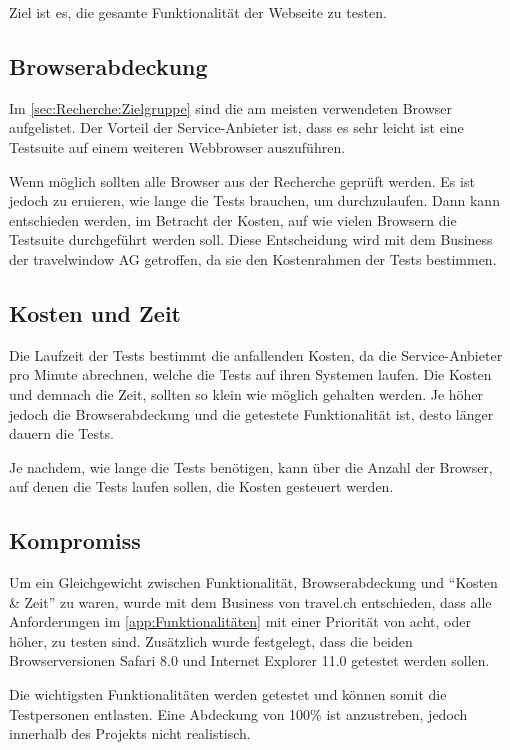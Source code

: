 Ziel ist es, die gesamte Funktionalität der Webseite zu testen.

\subsection{Browserabdeckung}
Im \cref{sec:Recherche:Zielgruppe}  sind die am meisten verwendeten Browser aufgelistet. Der Vorteil der Service-Anbieter ist, dass es sehr leicht ist eine Testsuite auf einem weiteren Webbrowser auszuführen. 

Wenn möglich sollten alle Browser aus der Recherche geprüft werden. Es ist jedoch zu eruieren, wie lange die Tests brauchen, um durchzulaufen. Dann kann entschieden werden, im Betracht der Kosten, auf wie vielen Browsern die Testsuite durchgeführt werden soll. Diese Entscheidung wird mit dem Business der travelwindow AG getroffen, da sie den Kostenrahmen der Tests bestimmen.

\subsection{Kosten und Zeit}
Die Laufzeit der Tests bestimmt die anfallenden Kosten, da die Service-Anbieter pro Minute abrechnen, welche die Tests auf ihren Systemen laufen. Die Kosten und demnach die Zeit, sollten so klein wie möglich gehalten werden. Je höher jedoch die Browserabdeckung und die getestete Funktionalität ist, desto länger dauern die Tests.

Je nachdem, wie lange die Tests benötigen, kann über die Anzahl der Browser, auf denen die Tests laufen sollen, die Kosten gesteuert werden.

\subsection{Kompromiss}
\label{sec:analyse:testabdeckung}
Um ein Gleichgewicht zwischen Funktionalität, Browserabdeckung und "`Kosten \& Zeit"' zu waren, wurde mit dem Business von travel.ch entschieden, dass alle Anforderungen im \cref{app:Funktionalitäten}  mit einer Priorität von acht, oder höher, zu testen sind. Zusätzlich wurde festgelegt, dass die beiden Browserversionen Safari 8.0 und Internet Explorer 11.0 getestet werden sollen.

Die wichtigsten Funktionalitäten werden getestet und können somit die Testpersonen entlasten. Eine Abdeckung von 100\% ist anzustreben, jedoch innerhalb des Projekts nicht realistisch.

